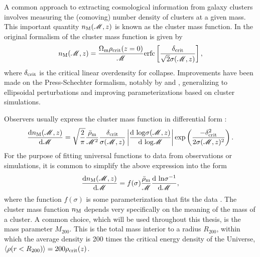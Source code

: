 A common approach to extracting cosmological information from galaxy clusters involves measuring the (comoving) number density of clusters at a given mass.  This important quantity $n_{\rm M} ({\mathscr M},z)$ is known as the cluster mass function. In the original formalism of \citet{PS74} the cluster mass function is given by
\begin{equation}
\label{eqn:massfunc}
n_{\rm M} ({\mathscr M},z) = \frac{\Omega_{\rm m} \rho_{\rm crit}(z=0)}{\mathscr M} {\rm erfc}\left[ \frac{\delta_{\rm crit}}{\sqrt{2}\sigma({\mathscr M},z)} \right],
\end{equation}
where $\delta_{\rm crit}$ is the critical linear overdensity for collapse. Improvements have been made on the Press-Schechter formalism, notably by \citet{Sheth99} and \citet{Jenkins01}, generalizing to ellipsoidal perturbations and improving parameterizations based on cluster simulations. 

Observers usually express the cluster mass function in differential form \citep{Borgani08}:
\begin{equation}
\label{eqn:diffmassfunc}
\frac{{\rm d} n_{\rm M} ({\mathscr M},z)}{{\rm d}{\mathscr M}} = \sqrt{\frac{2}{\pi}} \frac{\bar{\rho}_{\rm m}}{{\mathscr M}^2} \frac{\delta_{\rm crit}}{\sigma({\mathscr M},z)} \left| \frac{{\rm d \ log}\sigma({\mathscr M},z)}{{\rm d \ log}{\mathscr M}} \right| {\rm exp}\left( \frac{-\delta_{\rm crit}^2}{2\sigma({\mathscr M},z)^2} \right).
\end{equation}
For the purpose of fitting universal functions to data from observations or simulations, it is common to simplify the above expression into the form
\begin{equation}
\frac{{\rm d} n_{\rm M} ({\mathscr M},z)}{{\rm d}{\mathscr M}} = f(\sigma) \frac{\bar{\rho}_{\rm m}}{\mathscr M} \frac{{\rm d \ ln}\sigma^{-1}}{{\rm d}{\mathscr M}},
\end{equation}
where the function $f(\sigma)$ is some parameterization that fits the data \citep[see e.g.][]{Tinker08}. The cluster mass function $n_{\rm M}$ depends very specifically on the meaning of the mass of a cluster. A common choice, which will be used throughout this thesis, is the mass parameter $M_{200}$. This is the total mass interior to a radius $R_{200}$, within which the average density is 200 times the critical energy density of the Universe, $\langle \rho (r<R_{200}) \rangle = 200 \rho_{\rm crit}(z)$.


